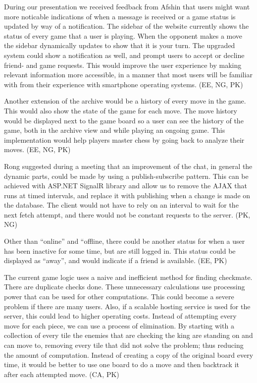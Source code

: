 \documentclass[acmlarge, review=false, screen=true]{acmart}
\begin{document}
  During our presentation we received feedback from Afshin that users might want more noticable indications of when a message is received or a game status is updated by way of a notification. The sidebar of the website currently shows the status of every game that a user is playing. When the opponent makes a move the sidebar dynamically updates to show that it is your turn. The upgraded system could show a notification as well, and prompt users to accept or decline friend- and game requests. This would improve the user experience by making relevant information more accessible, in a manner that most users will be familiar with from their experience with smartphone operating systems. (EE, NG, PK)

  Another extension of the archive would be a history of every move in the game. This would also show the state of the game for each move. The move history would be displayed next to the game board so a user can see the history of the game, both in the archive view and while playing an ongoing game. This implementation would help players master chess by going back to analyze their moves. (EE, NG, PK)

  Rong suggested during a meeting that an improvement of the chat, in general the dynamic parts, could be made by using a publish-subscribe pattern. This can be achieved with ASP.NET SignalR library and allow us to remove the AJAX that runs at timed intervals, and replace it with publishing when a change is made on the database\cite{signalr}. The client would not have to rely on an interval to wait for the next fetch attempt, and there would not be constant requests to the server. (PK, NG)

  Other than “online” and “offline, there could be another status for when a user has been inactive for some time, but are still logged in. This status could be displayed as “away”, and would indicate if a friend is available. (EE, PK)

  The current game logic uses a naive and inefficient method for finding checkmate. There are duplicate checks done. These unnecessary calculations use processing power that can be used for other computations. This could become a severe problem if there are many users. Also, if a scalable hosting service is used for the server, this could lead to higher operating costs. Instead of attempting every move for each piece, we can use a process of elimination. By starting with a collection of every tile the enemies that are checking the king are standing on and can move to, removing every tile that did not solve the problem; thus reducing the amount of computation. Instead of creating a copy of the original board every time, it would be better to use one board to do a move and then backtrack it after each attempted move. (CA, PK)

  

    
  
\end{document}
